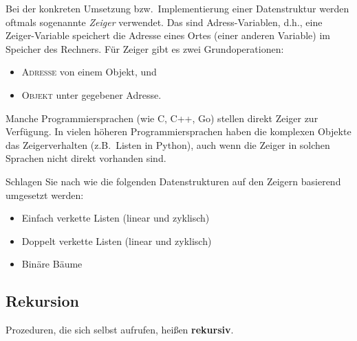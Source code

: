 \begin{bem} 
Bei der konkreten Umsetzung bzw.~Implementierung einer Datenstruktur werden oftmals sogenannte \emph{Zeiger} verwendet.
Das sind Adress-Variablen, d.h., eine Zeiger-Variable speichert die Adresse eines Ortes (einer anderen Variable) im Speicher des Rechners.
Für Zeiger gibt es zwei Grundoperationen: 
\begin{itemize}
	\item \textsc{Adresse} von einem Objekt, und 
	\item \textsc{Objekt} unter gegebener Adresse.
\end{itemize} 	
Manche Programmiersprachen (wie C, C++, Go) stellen direkt Zeiger zur Verfügung. 
	 In vielen höheren Programmiersprachen haben die komplexen Objekte das Zeigerverhalten (z.B.~Listen in Python), auch wenn die Zeiger in solchen Sprachen nicht direkt vorhanden sind. 
\end{bem} 


\begin{aufg} 
	Schlagen Sie nach wie die folgenden Datenstrukturen auf den Zeigern basierend umgesetzt werden: 
	\begin{itemize}
			\item Einfach verkette Listen (linear und zyklisch)
			\item Doppelt verkette Listen  (linear und zyklisch)
			\item Binäre Bäume
	\end{itemize} 
\end{aufg} 

\subsection{Rekursion}


\begin{defn}
	Prozeduren, die sich selbst aufrufen, heißen \textbf{rekursiv}. 
\end{defn} 

